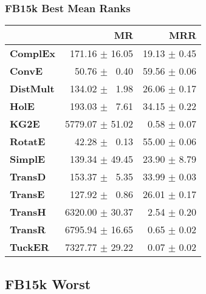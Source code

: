 \documentclass{article}
\begin{document}
\subsubsection{FB15k Best Mean Ranks}
    \begin{center}
    \begin{tabular}{lrr}
\toprule
{} &               MR &           MRR \\
\midrule
\textbf{ComplEx } &  $\phantom{5}$171.16 $\pm$ 16.05 &  19.13 $\pm$ 0.45 \\
\textbf{ConvE   } &  $\phantom{5}$$\phantom{5}$50.76 $\pm$ $\phantom{5}$0.40 &  59.56 $\pm$ 0.06 \\
\textbf{DistMult} &  $\phantom{5}$134.02 $\pm$ $\phantom{5}$1.98 &  26.06 $\pm$ 0.17 \\
\textbf{HolE    } &  $\phantom{5}$193.03 $\pm$ $\phantom{5}$7.61 &  34.15 $\pm$ 0.22 \\
\textbf{KG2E    } &  5779.07 $\pm$ 51.02 &  $\phantom{5}$0.58 $\pm$ 0.07 \\
\textbf{RotatE  } &  $\phantom{5}$$\phantom{5}$42.28 $\pm$ $\phantom{5}$0.13 &  55.00 $\pm$ 0.06 \\
\textbf{SimplE  } &  $\phantom{5}$139.34 $\pm$ 49.45 &  23.90 $\pm$ 8.79 \\
\textbf{TransD  } &  $\phantom{5}$153.37 $\pm$ $\phantom{5}$5.35 &  33.99 $\pm$ 0.03 \\
\textbf{TransE  } &  $\phantom{5}$127.92 $\pm$ $\phantom{5}$0.86 &  26.01 $\pm$ 0.17 \\
\textbf{TransH  } &  6320.00 $\pm$ 30.37 &  $\phantom{5}$2.54 $\pm$ 0.20 \\
\textbf{TransR  } &  6795.94 $\pm$ 16.65 &  $\phantom{5}$0.65 $\pm$ 0.02 \\
\textbf{TuckER  } &  7327.77 $\pm$ 29.22 &  $\phantom{5}$0.07 $\pm$ 0.02 \\
\bottomrule
\end{tabular}

    \end{center}
\subsection{FB15k Worst}
\end{document}

